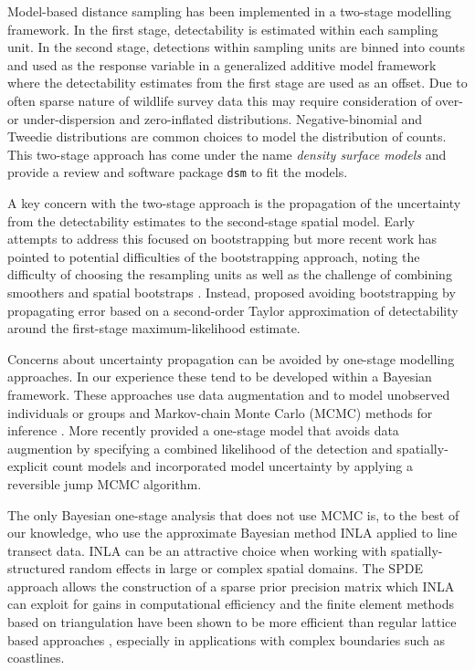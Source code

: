 \documentclass[preprint,12pt]{elsarticle}
\begin{document}
Model-based distance sampling has been implemented in a two-stage modelling framework.  In the first stage, detectability is estimated within each sampling unit.  In the second stage, detections within sampling units are binned into counts and used as the response variable in a generalized additive model framework where the detectability estimates from the first stage are used as an offset.  Due to often sparse nature of wildlife survey data this may require consideration of over- or under-dispersion and zero-inflated distributions.  Negative-binomial and Tweedie distributions are common choices to model the distribution of counts.  This two-stage approach has come under the name \textit{density surface models} and \cite{miller_spatial_2013} provide a review and software package \texttt{dsm} to fit the models.  

A key concern with the two-stage approach is the propagation of the uncertainty from the detectability estimates to the second-stage spatial model.  Early attempts to address this focused on bootstrapping \citep{lahiri_resampling_2003, hedley_spatial_2004} but more recent work has pointed to potential difficulties of the bootstrapping approach, noting the difficulty of choosing the resampling units as well as the challenge of combining smoothers and spatial bootstraps \citep{bravington_reliable_2018-1}. Instead, \cite{bravington_reliable_2018-1}  proposed avoiding bootstrapping by propagating error based on a second-order Taylor approximation of detectability around the first-stage maximum-likelihood estimate.

Concerns about uncertainty propagation can be avoided by one-stage modelling approaches.  In our experience these tend to be developed within a Bayesian framework.  These approaches use data augmentation and to model unobserved individuals or groups and Markov-chain Monte Carlo (MCMC) methods for inference \citep{royle_hierarchical_2008, schmidt_using_2012}.  More recently  \cite{oedekoven_bayesian_2014} provided a one-stage model that avoids data augmention by specifying a combined likelihood of the detection and spatially-explicit count models and incorporated model uncertainty by applying a reversible jump MCMC algorithm.

The only Bayesian one-stage analysis that does not use MCMC is, to the best of our knowledge, \citet{yuan_point_2017} who use the approximate Bayesian method INLA applied to line transect data.  INLA can be an attractive choice when working with spatially-structured random effects in large or complex spatial domains.  The SPDE approach \citep{lindgren_explicit_2011} allows the construction of a sparse prior precision matrix which INLA can exploit for gains in computational efficiency and the finite element methods based on triangulation have been shown to be more efficient than regular lattice based approaches \citep{simpson_going_2016}, especially in applications with complex boundaries such as coastlines. 
\end{document}
